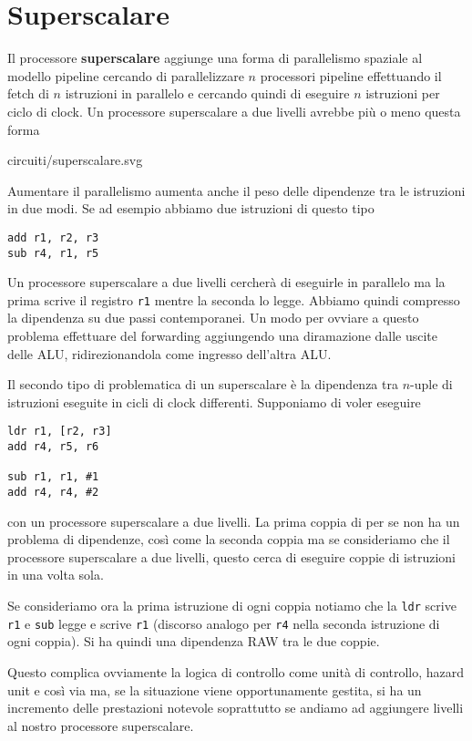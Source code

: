 \section{Superscalare}
Il processore \textbf{superscalare} aggiunge una forma di parallelismo spaziale al modello pipeline
cercando di parallelizzare $n$ processori pipeline effettuando il fetch di $n$ istruzioni in
parallelo e cercando quindi di eseguire $n$ istruzioni per ciclo di clock. Un processore
superscalare a due livelli avrebbe più o meno questa forma
\begin{center}
	 {circuiti/superscalare.svg}
\end{center}
Aumentare il parallelismo aumenta anche il peso delle dipendenze tra le istruzioni in due modi. Se
ad esempio abbiamo due istruzioni di questo tipo
\begin{verbatim}
add r1, r2, r3
sub r4, r1, r5
\end{verbatim}
Un processore superscalare a due livelli cercherà di eseguirle in parallelo ma la prima scrive il
registro \verb|r1| mentre la seconda lo legge. Abbiamo quindi compresso la dipendenza su due passi
contemporanei. Un modo per ovviare a questo problema effettuare del forwarding aggiungendo una
diramazione dalle uscite delle ALU, ridirezionandola come ingresso dell'altra ALU.

Il secondo tipo di problematica di un superscalare è la dipendenza tra $n$-uple di istruzioni
eseguite in cicli di clock differenti. Supponiamo di voler eseguire
\begin{verbatim}
ldr r1, [r2, r3]
add r4, r5, r6

sub r1, r1, #1
add r4, r4, #2
\end{verbatim}
con un processore superscalare a due livelli. La prima coppia di per se non ha un problema di
dipendenze, così come la seconda coppia ma se consideriamo che il processore superscalare a due
livelli, questo cerca di eseguire coppie di istruzioni in una volta sola.

Se consideriamo ora la prima istruzione di ogni coppia notiamo che la \verb|ldr| scrive \verb|r1|
e \verb|sub| legge e scrive \verb|r1| (discorso analogo per \verb|r4| nella seconda istruzione di
ogni coppia). Si ha quindi una dipendenza RAW tra le due coppie.

Questo complica ovviamente la logica di controllo come unità di controllo, hazard unit e così via
ma, se la situazione viene opportunamente gestita, si ha un incremento delle prestazioni notevole
soprattutto se andiamo ad aggiungere livelli al nostro processore superscalare.